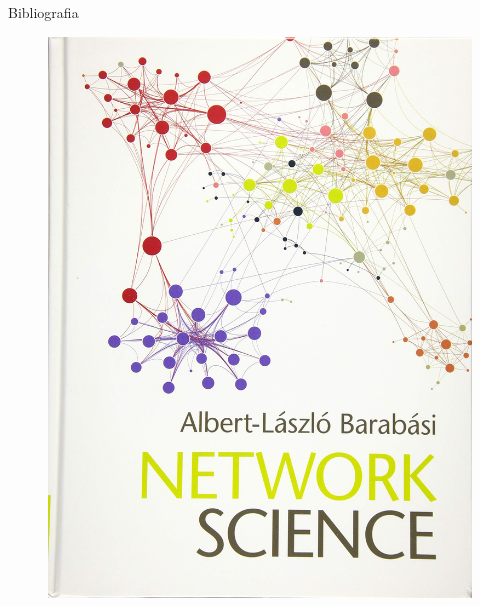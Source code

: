 \documentclass[12pt,mathserif,aspectratio=169]{beamer}
\begin{document}
\begin{frame}{Bibliografia}
\begin{center}
\begin{minipage}{0.25\textwidth}
\begin{figure}
                \includegraphics[width=0.25\paperwidth]{fig/textbook3.jpg}
            \end{figure}
        \end{minipage}
    \end{center}
\end{frame}
\end{document}
